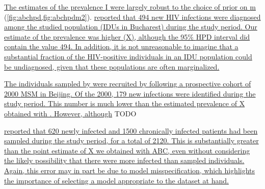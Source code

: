 
{\color{blue}\uline{
The estimates of the prevalence \gls{I} were largely robust to the choice of
prior on \gls{m}} (\cref{fig:abchpd,fig:abchpdm2}).
\textcite{niculescu2015recent} \uline{reported that 494 new HIV infections were
diagnosed among the studied population (\glspl{IDU} in Bucharest) during the
study period. Our estimate of the prevalence was higher (X), although the 95\%
\gls{HPD} interval did contain the value 494. In addition, it is not
unreasonable to imagine that a substantial fraction of the \gls{HIV}-positive
individuals in an \gls{IDU} population could be undiagnosed, given that these
populations are often marginalized.}

\uline{The individuals sampled by \autocite{wang2015targeting} were recruited by
following a prospective cohort of 2000 \gls{MSM} in Beijing. Of the 2000, 179
new infections were identified during the study period. This number is much
lower than the estimated prevalence of X obtained with .
However, although} \citeauthor{wang2015targeting} TODO

\textcite{cuevas2009hiv} \uline{reported that 620 newly infected and 1500
chronically infected patients had been sampled during the study period, for a
total of 2120. This is substantially greater than the point estimate of X we
obtained with \gls{ABC}, even without considering the likely possibility that
there were more infected than sampled individuals. Again, this error may in
part be due to model misspecification, which highlights the importance of
selecting a model appropriate to the dataset at hand.}}

